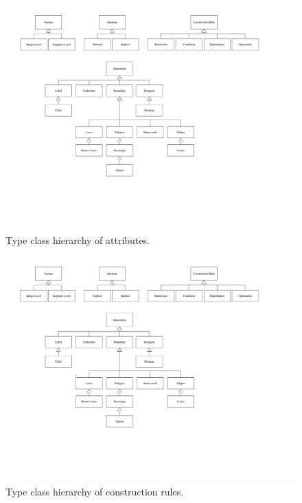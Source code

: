 \begin{figure}[p]
  \centering
  \includegraphics{images/class_diagrams/attribute}
  \caption{Type class hierarchy of attributes.}
  \label{fig:metamodel_class_diagrams:attributes}  
\end{figure}

\begin{figure}[p]
  \centering
  \includegraphics{images/class_diagrams/construction_rule}
  \caption{Type class hierarchy of construction rules.}
  \label{fig:metamodel_class_diagrams:construction_rules}  
\end{figure}
